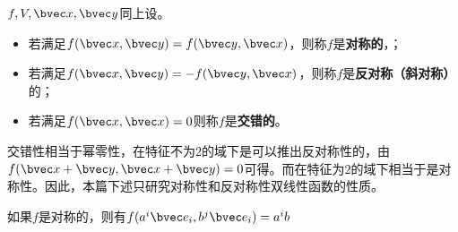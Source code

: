\begin{definition}{}
$f,V,\bvec x,\bvec y$同上设。
\begin{itemize}
\item 若满足$f(\bvec x,\bvec y)=f(\bvec y,\bvec x)$，则称$f$是\textbf{对称的}，；
\item 若满足$f(\bvec x,\bvec y)=-f(\bvec y,\bvec x)$，则称$f$是\textbf{反对称（斜对称）}的；
\item 若满足$f(\bvec x,\bvec x)=0$则称$f$是\textbf{交错的}。
\end{itemize}
\end{definition}
交错性相当于幂零性，在特征不为$2$的域下是可以推出反对称性的，由$f(\bvec x+\bvec y,\bvec x+\bvec y)=0$可得。而在特征为$2$的域下相当于是对称性。因此，本篇下述只研究对称性和反对称性双线性函数的性质。

如果$f$是对称的，则有$f(a^i\bvec e_i,b^j\bvec e_i)=a^ib$